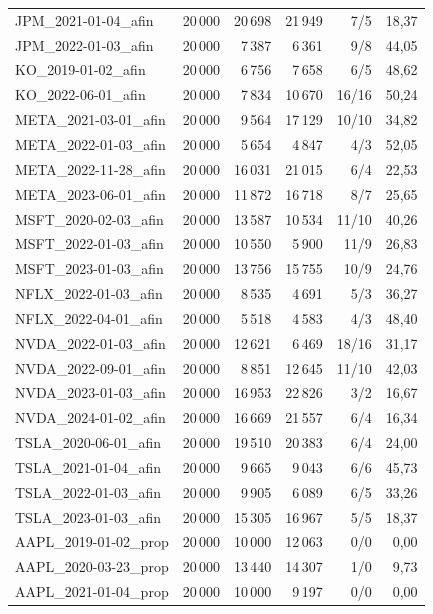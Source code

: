 \begin{longtable}{lrrrrr}
JPM\_2021-01-04\_afin & 20\,000 & 20\,698 & 21\,949 & 7/5 & 18,37 \\
JPM\_2022-01-03\_afin & 20\,000 & 7\,387 & 6\,361 & 9/8 & 44,05 \\
KO\_2019-01-02\_afin & 20\,000 & 6\,756 & 7\,658 & 6/5 & 48,62 \\
KO\_2022-06-01\_afin & 20\,000 & 7\,834 & 10\,670 & 16/16 & 50,24 \\
META\_2021-03-01\_afin & 20\,000 & 9\,564 & 17\,129 & 10/10 & 34,82 \\
META\_2022-01-03\_afin & 20\,000 & 5\,654 & 4\,847 & 4/3 & 52,05 \\
META\_2022-11-28\_afin & 20\,000 & 16\,031 & 21\,015 & 6/4 & 22,53 \\
META\_2023-06-01\_afin & 20\,000 & 11\,872 & 16\,718 & 8/7 & 25,65 \\
MSFT\_2020-02-03\_afin & 20\,000 & 13\,587 & 10\,534 & 11/10 & 40,26 \\
MSFT\_2022-01-03\_afin & 20\,000 & 10\,550 & 5\,900 & 11/9 & 26,83 \\
MSFT\_2023-01-03\_afin & 20\,000 & 13\,756 & 15\,755 & 10/9 & 24,76 \\
NFLX\_2022-01-03\_afin & 20\,000 & 8\,535 & 4\,691 & 5/3 & 36,27 \\
NFLX\_2022-04-01\_afin & 20\,000 & 5\,518 & 4\,583 & 4/3 & 48,40 \\
NVDA\_2022-01-03\_afin & 20\,000 & 12\,621 & 6\,469 & 18/16 & 31,17 \\
NVDA\_2022-09-01\_afin & 20\,000 & 8\,851 & 12\,645 & 11/10 & 42,03 \\
NVDA\_2023-01-03\_afin & 20\,000 & 16\,953 & 22\,826 & 3/2 & 16,67 \\
NVDA\_2024-01-02\_afin & 20\,000 & 16\,669 & 21\,557 & 6/4 & 16,34 \\
TSLA\_2020-06-01\_afin & 20\,000 & 19\,510 & 20\,383 & 6/4 & 24,00 \\
TSLA\_2021-01-04\_afin & 20\,000 & 9\,665 & 9\,043 & 6/6 & 45,73 \\
TSLA\_2022-01-03\_afin & 20\,000 & 9\,905 & 6\,089 & 6/5 & 33,26 \\
TSLA\_2023-01-03\_afin & 20\,000 & 15\,305 & 16\,967 & 5/5 & 18,37 \\
AAPL\_2019-01-02\_prop & 20\,000 & 10\,000 & 12\,063 & 0/0 & 0,00 \\
AAPL\_2020-03-23\_prop & 20\,000 & 13\,440 & 14\,307 & 1/0 & 9,73 \\
AAPL\_2021-01-04\_prop & 20\,000 & 10\,000 & 9\,197 & 0/0 & 0,00 \\

\end{longtable}

